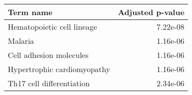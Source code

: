 \begin{tabular}{lr}
\toprule
                   Term name &  Adjusted p-value \\
\midrule
  Hematopoietic cell lineage &          7.22e-08 \\
                     Malaria &          1.16e-06 \\
     Cell adhesion molecules &          1.16e-06 \\
 Hypertrophic cardiomyopathy &          1.16e-06 \\
   Th17 cell differentiation &          2.34e-06 \\
\bottomrule
\end{tabular}
